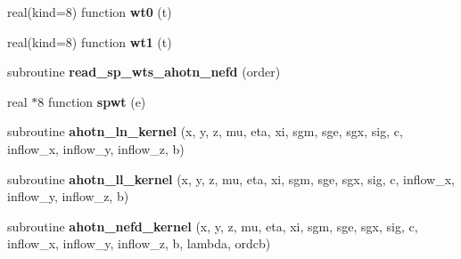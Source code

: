 \begin{DoxyCompactItemize}
\item 
\hypertarget{classkernel__module_aa7132726727d08e3e2637052f59abdad}{real(kind=8) function {\bfseries wt0} (t)}\label{classkernel__module_aa7132726727d08e3e2637052f59abdad}

\item 
\hypertarget{classkernel__module_a2167a318581a58f1b295119931ddd408}{real(kind=8) function {\bfseries wt1} (t)}\label{classkernel__module_a2167a318581a58f1b295119931ddd408}

\item 
\hypertarget{classkernel__module_a4074268fc2e0b2ba21b5ad39eec86ab3}{subroutine {\bfseries read\-\_\-sp\-\_\-wts\-\_\-ahotn\-\_\-nefd} (order)}\label{classkernel__module_a4074268fc2e0b2ba21b5ad39eec86ab3}

\item 
\hypertarget{classkernel__module_a6c7125e68f81cb0e7cd9f3e48abc126e}{real $\ast$8 function {\bfseries spwt} (e)}\label{classkernel__module_a6c7125e68f81cb0e7cd9f3e48abc126e}

\item 
\hypertarget{classkernel__module_a3d3eccec75c0ba28bb09ab8ca22818bc}{subroutine {\bfseries ahotn\-\_\-ln\-\_\-kernel} (x, y, z, mu, eta, xi, sgm, sge, sgx, sig, c, inflow\-\_\-x, inflow\-\_\-y, inflow\-\_\-z, b)}\label{classkernel__module_a3d3eccec75c0ba28bb09ab8ca22818bc}

\item 
\hypertarget{classkernel__module_a98095dff722fb7046e5b08932b02149d}{subroutine {\bfseries ahotn\-\_\-ll\-\_\-kernel} (x, y, z, mu, eta, xi, sgm, sge, sgx, sig, c, inflow\-\_\-x, inflow\-\_\-y, inflow\-\_\-z, b)}\label{classkernel__module_a98095dff722fb7046e5b08932b02149d}

\item 
\hypertarget{classkernel__module_aa6341d47b5386becb826bdbb16be5e89}{subroutine {\bfseries ahotn\-\_\-nefd\-\_\-kernel} (x, y, z, mu, eta, xi, sgm, sge, sgx, sig, c, inflow\-\_\-x, inflow\-\_\-y, inflow\-\_\-z, b, lambda, ordcb)}\label{classkernel__module_aa6341d47b5386becb826bdbb16be5e89}

\end{DoxyCompactItemize}
